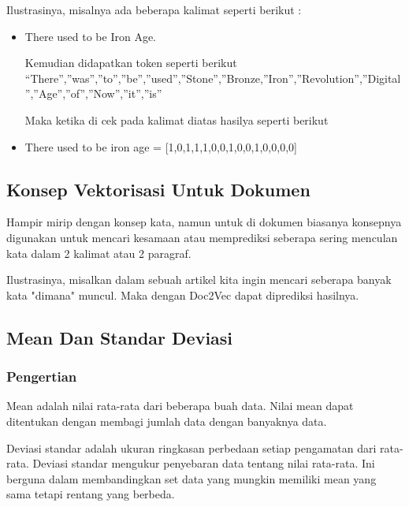 Ilustrasinya, misalnya ada beberapa kalimat seperti berikut :
\begin{itemize}
\item There used to be Iron Age.

Kemudian didapatkan token seperti berikut “There”,”was”,”to”,”be”,”used”,”Stone”,”Bronze,”Iron”,”Revolution”,”Digital”,”Age”,”of”,”Now”,”it”,”is”

Maka ketika di cek pada kalimat diatas hasilya seperti berikut 
\item There used to be iron age = [1,0,1,1,1,0,0,1,0,0,1,0,0,0,0]
\end{itemize}

\subsection{Konsep Vektorisasi Untuk Dokumen}
Hampir mirip dengan konsep kata, namun untuk di dokumen biasanya konsepnya digunakan untuk mencari kesamaan atau memprediksi seberapa sering menculan kata dalam 2 kalimat atau 2 paragraf.

Ilustrasinya, misalkan dalam sebuah artikel kita ingin mencari seberapa banyak kata "dimana" muncul. Maka dengan Doc2Vec dapat diprediksi hasilnya.

\subsection{Mean Dan Standar Deviasi}
\subsubsection{Pengertian}
Mean adalah nilai rata-rata dari beberapa buah data. Nilai mean dapat ditentukan dengan membagi jumlah data dengan banyaknya data.

Deviasi standar adalah ukuran ringkasan perbedaan setiap pengamatan dari rata-rata. Deviasi standar mengukur penyebaran data tentang nilai rata-rata. Ini berguna dalam membandingkan set data yang mungkin memiliki mean yang sama tetapi rentang yang berbeda.


